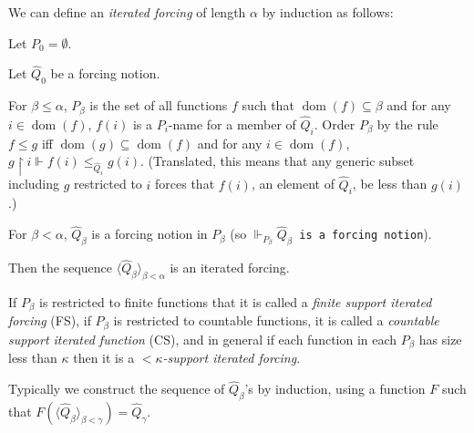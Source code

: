 \documentclass[12pt]{article}
\begin{document}
We can define an \emph{iterated forcing} of length $\alpha$ by induction as follows:

Let $P_0=\emptyset$.

Let $\hat{Q}_0$ be a forcing notion.

For $\beta\leq\alpha$, $P_\beta$ is the set of all functions $f$ such that $\operatorname{dom}(f)\subseteq\beta$ and for any $i\in\operatorname{dom}(f)$, $f(i)$ is a $P_i$-name for a member of $\hat{Q}_i$.  Order $P_\beta$ by the rule $f\leq g$ iff $\operatorname{dom}(g)\subseteq\operatorname{dom}(f)$ and for any $i\in\operatorname{dom}(f)$, $g\upharpoonright i\Vdash f(i)\leq_{\hat{Q}_i}g(i)$.  (Translated, this means that any generic subset including $g$ restricted to $i$ forces that $f(i)$, an element of $\hat{Q}_i$, be less than $g(i)$.)

For $\beta<\alpha$, $\hat{Q}_\beta$ is a forcing notion in $P_\beta$ (so $\Vdash_{P_\beta} \hat{Q}_\beta$\texttt{ is a forcing notion}).

Then the sequence $\langle \hat{Q}_\beta\rangle_{\beta<\alpha}$ is an iterated forcing.

If $P_\beta$ is restricted to finite functions that it is called a \emph{finite support iterated forcing} (FS), if $P_\beta$ is restricted to countable functions, it is called a \emph{countable support iterated function} (CS), and in general if each function in each $P_\beta$ has size less than $\kappa$ then it is a \emph{$<\kappa$-support iterated forcing}.

Typically we construct the sequence of $\hat{Q}_\beta$'s by induction, using a function $F$ such that $F(\langle \hat{Q}_\beta\rangle_{\beta<\gamma})=\hat{Q}_\gamma$.
\end{document}
